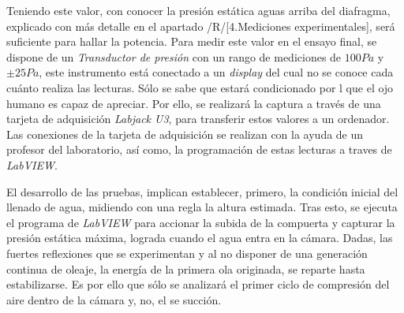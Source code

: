 Teniendo este valor, con conocer la presión estática aguas arriba del
diafragma, explicado con más detalle en el apartado /R/{[}4.Mediciones
experimentales{]}, será suficiente para hallar la potencia. Para medir
este valor en el ensayo final, se dispone de un \emph{Transductor de
presión} con un rango de mediciones de \(100Pa\) y \(\pm 25 Pa\), este
instrumento está conectado a un \emph{display} del cual no se conoce
cada cuánto realiza las lecturas. Sólo se sabe que estará condicionado
por l que el ojo humano es capaz de apreciar. Por ello, se realizará la
captura a través de una tarjeta de adquisición \emph{Labjack U3}, para
transferir estos valores a un ordenador. Las conexiones de la tarjeta de
adquisición se realizan con la ayuda de un profesor del laboratorio, así
como, la programación de estas lecturas a traves de \emph{LabVIEW}.

El desarrollo de las pruebas, implican establecer, primero, la condición
inicial del llenado de agua, midiendo con una regla la altura estimada.
Tras esto, se ejecuta el programa de \emph{LabVIEW} para accionar la
subida de la compuerta y capturar la presión estática máxima, lograda
cuando el agua entra en la cámara. Dadas, las fuertes reflexiones que se
experimentan y al no disponer de una generación continua de oleaje, la
energía de la primera ola originada, se reparte hasta estabilizarse. Es
por ello que sólo se analizará el primer ciclo de compresión del aire
dentro de la cámara y, no, el se succión.
